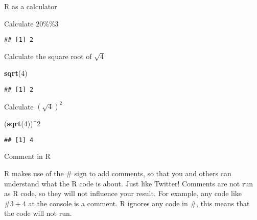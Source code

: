 \documentclass[ignorenonframetext,]{beamer}
\newenvironment{Shaded}{\begin{snugshade}}{\end{snugshade}}
\newcommand{\KeywordTok}[1]{\textcolor[rgb]{0.13,0.29,0.53}{\textbf{#1}}}
\newcommand{\DecValTok}[1]{\textcolor[rgb]{0.00,0.00,0.81}{#1}}
\newcommand{\CommentTok}[1]{\textcolor[rgb]{0.56,0.35,0.01}{\textit{#1}}}
\newcommand{\OperatorTok}[1]{\textcolor[rgb]{0.81,0.36,0.00}{\textbf{#1}}}
\newcommand{\NormalTok}[1]{#1}
\begin{document}
\begin{frame}[fragile]{R as a calculator}

Calculate \(20\%\%3\)

\begin{Shaded}
\end{Shaded}

\begin{verbatim}
## [1] 2
\end{verbatim}

Calculate the square root of \(\sqrt{4}\)

\begin{Shaded}
\begin{Highlighting}[]
\KeywordTok{sqrt}\NormalTok{(}\DecValTok{4}\NormalTok{)}
\end{Highlighting}
\end{Shaded}

\begin{verbatim}
## [1] 2
\end{verbatim}

Calculate \((\sqrt{4})^2\)

\begin{Shaded}
\begin{Highlighting}[]
\NormalTok{(}\KeywordTok{sqrt}\NormalTok{(}\DecValTok{4}\NormalTok{))}\OperatorTok{^}\DecValTok{2}
\end{Highlighting}
\end{Shaded}

\begin{verbatim}
## [1] 4
\end{verbatim}

\end{frame}

\begin{frame}[fragile]{Comment in R}

R makes use of the \# sign to add comments, so that you and others can
understand what the R code is about. Just like Twitter! Comments are not
run as R code, so they will not influence your result. For example, any
code like \(\#3 + 4\) at the console is a comment. R ignores any code in
\#, this means that the code will not run.

\begin{Shaded}
\end{Shaded}

\end{frame}
\end{document}
